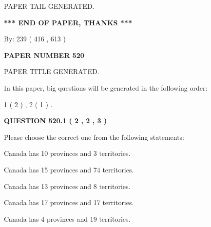 \documentclass[12pt]{article}
\begin{document}
   
   
\vspace{2.0in} PAPER TAIL GENERATED.
   
   
   
   
\vspace{1.0in} 
{\textbf{\large{ *** END OF PAPER, THANKS *** }}} 
   
   
\hspace{1.0in} By: 
 239 ( 416 ,  613 )
   
   
   
   
\newpage 
\setcounter{page}{ 
   520001 } 
   
   
   
   
 {\textbf{ \Large{ PAPER NUMBER  520  }}}
   
   
\vspace{0.2in}
   
   
   
   
   
   
   
   
 \vspace{0.2in}
 
 
 
 
   
   
 PAPER TITLE GENERATED.
   
   
   
\vspace{0.2in}
   
In this paper, big questions will be generated in the following order: 
   
   
   1 ( 2 )
 ,
   2 ( 1 )
 .
  
\vspace{0.2in}
  
{\textbf{\Large{QUESTION
520.1 
 ( 2 , 2 , 3 )
}}}
  
  
Please choose the correct one from the following statements:
 
 
Canada has 10  provinces and 3 territories.
 
 
Canada has  15 provinces and  74 territories.
 
 
Canada has  13 provinces and  8 territories.
 
 
Canada has  17 provinces and  17 territories.
 
 
Canada has   4 provinces and  19 territories.
 
\end{document}
